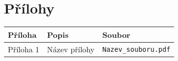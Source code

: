 \section{Přílohy}
\begin{tabular}{lll}
  \textbf{Příloha} & \textbf{Popis} & \textbf{Soubor} \\
  \hline
  Příloha 1 & Název přílohy & \texttt{Nazev\_souboru.pdf} \\
\end{tabular}
